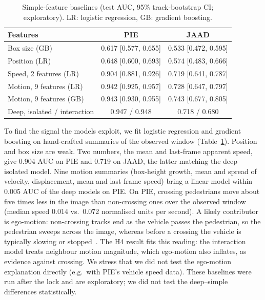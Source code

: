 \documentclass[conference]{IEEEtran}
\begin{document}
\begin{table}[t]
\centering
\caption{Simple-feature baselines (test AUC, 95\% track-bootstrap CI; exploratory). LR: logistic regression, GB: gradient boosting.}
\label{tab:base}
\footnotesize
\setlength{\tabcolsep}{3pt}
\begin{tabular}{@{}lcc@{}}
\toprule
Features & PIE & JAAD \\
\midrule
Box size (GB) & 0.617 [0.577, 0.655] & 0.533 [0.472, 0.595] \\
Position (LR) & 0.648 [0.600, 0.693] & 0.574 [0.483, 0.666] \\
Speed, 2 features (LR) & 0.904 [0.881, 0.926] & 0.719 [0.641, 0.787] \\
Motion, 9 features (LR) & 0.942 [0.925, 0.957] & 0.728 [0.647, 0.797] \\
Motion, 9 features (GB) & 0.943 [0.930, 0.955] & 0.743 [0.677, 0.805] \\
\midrule
Deep, isolated / interaction & 0.947 / 0.948 & 0.718 / 0.680 \\
\bottomrule
\end{tabular}
\end{table}

To find the signal the models exploit, we fit logistic regression and gradient boosting on hand-crafted summaries of the observed window (Table~\ref{tab:base}). Position and box size are weak. Two numbers, the mean and last-frame apparent speed, give 0.904 AUC on PIE and 0.719 on JAAD, the latter matching the deep isolated model. Nine motion summaries (box-height growth, mean and spread of velocity, displacement, mean and last-frame speed) bring a linear model within 0.005 AUC of the deep models on PIE. On PIE, crossing pedestrians move about five times less in the image than non-crossing ones over the observed window (median speed 0.014 vs.\ 0.072 normalised units per second). A likely contributor is ego-motion: non-crossing tracks end as the vehicle passes the pedestrian, so the pedestrian sweeps across the image, whereas before a crossing the vehicle is typically slowing or stopped~\cite{kotseruba2021benchmark}. The H4 result fits this reading: the interaction model treats neighbour motion magnitude, which ego-motion also inflates, as evidence against crossing. We stress that we did not test the ego-motion explanation directly (e.g.\ with PIE's vehicle speed data). These baselines were run after the lock and are exploratory; we did not test the deep--simple differences statistically.
\end{document}
